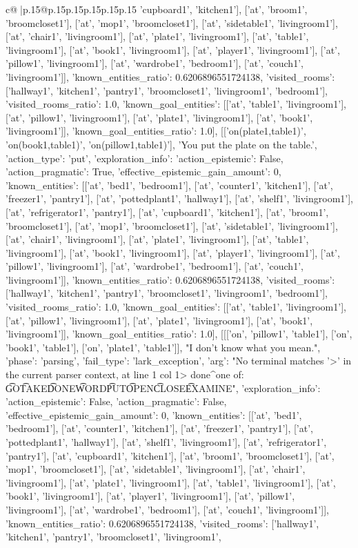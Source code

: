 \documentclass{article}
\begin{document}
{\begin{supertabular}{c@{$\;$}|p{.15\linewidth}@{}p{.15\linewidth}p{.15\linewidth}p{.15\linewidth}p{.15\linewidth}p{.15\linewidth}}
{{{'cupboard1', 'kitchen1'], ['at', 'broom1', 'broomcloset1'], ['at', 'mop1', 'broomcloset1'], ['at', 'sidetable1', 'livingroom1'], ['at', 'chair1', 'livingroom1'], ['at', 'plate1', 'livingroom1'], ['at', 'table1', 'livingroom1'], ['at', 'book1', 'livingroom1'], ['at', 'player1', 'livingroom1'], ['at', 'pillow1', 'livingroom1'], ['at', 'wardrobe1', 'bedroom1'], ['at', 'couch1', 'livingroom1']], 'known_entities_ratio': 0.6206896551724138, 'visited_rooms': ['hallway1', 'kitchen1', 'pantry1', 'broomcloset1', 'livingroom1', 'bedroom1'], 'visited_rooms_ratio': 1.0, 'known_goal_entities': [['at', 'table1', 'livingroom1'], ['at', 'pillow1', 'livingroom1'], ['at', 'plate1', 'livingroom1'], ['at', 'book1', 'livingroom1']], 'known_goal_entities_ratio': 1.0}}], [['on(plate1,table1)', 'on(book1,table1)', 'on(pillow1,table1)'], 'You put the plate on the table.', {'action_type': 'put', 'exploration_info': {'action_epistemic': False, 'action_pragmatic': True, 'effective_epistemic_gain_amount': 0, 'known_entities': [['at', 'bed1', 'bedroom1'], ['at', 'counter1', 'kitchen1'], ['at', 'freezer1', 'pantry1'], ['at', 'pottedplant1', 'hallway1'], ['at', 'shelf1', 'livingroom1'], ['at', 'refrigerator1', 'pantry1'], ['at', 'cupboard1', 'kitchen1'], ['at', 'broom1', 'broomcloset1'], ['at', 'mop1', 'broomcloset1'], ['at', 'sidetable1', 'livingroom1'], ['at', 'chair1', 'livingroom1'], ['at', 'plate1', 'livingroom1'], ['at', 'table1', 'livingroom1'], ['at', 'book1', 'livingroom1'], ['at', 'player1', 'livingroom1'], ['at', 'pillow1', 'livingroom1'], ['at', 'wardrobe1', 'bedroom1'], ['at', 'couch1', 'livingroom1']], 'known_entities_ratio': 0.6206896551724138, 'visited_rooms': ['hallway1', 'kitchen1', 'pantry1', 'broomcloset1', 'livingroom1', 'bedroom1'], 'visited_rooms_ratio': 1.0, 'known_goal_entities': [['at', 'table1', 'livingroom1'], ['at', 'pillow1', 'livingroom1'], ['at', 'plate1', 'livingroom1'], ['at', 'book1', 'livingroom1']], 'known_goal_entities_ratio': 1.0}}], [[['on', 'pillow1', 'table1'], ['on', 'book1', 'table1'], ['on', 'plate1', 'table1']], "I don't know what you mean.", {'phase': 'parsing', 'fail_type': 'lark_exception', 'arg': "No terminal matches '>' in the current parser context, at line 1 col 1\n\n> done\n^\nExpected one of: \n\t* GO\n\t* TAKE\n\t* DONE\n\t* WORD\n\t* PUT\n\t* OPEN\n\t* CLOSE\n\t* EXAMINE\n", 'exploration_info': {'action_epistemic': False, 'action_pragmatic': False, 'effective_epistemic_gain_amount': 0, 'known_entities': [['at', 'bed1', 'bedroom1'], ['at', 'counter1', 'kitchen1'], ['at', 'freezer1', 'pantry1'], ['at', 'pottedplant1', 'hallway1'], ['at', 'shelf1', 'livingroom1'], ['at', 'refrigerator1', 'pantry1'], ['at', 'cupboard1', 'kitchen1'], ['at', 'broom1', 'broomcloset1'], ['at', 'mop1', 'broomcloset1'], ['at', 'sidetable1', 'livingroom1'], ['at', 'chair1', 'livingroom1'], ['at', 'plate1', 'livingroom1'], ['at', 'table1', 'livingroom1'], ['at', 'book1', 'livingroom1'], ['at', 'player1', 'livingroom1'], ['at', 'pillow1', 'livingroom1'], ['at', 'wardrobe1', 'bedroom1'], ['at', 'couch1', 'livingroom1']], 'known_entities_ratio': 0.6206896551724138, 'visited_rooms': ['hallway1', 'kitchen1', 'pantry1', 'broomcloset1', 'livingroom1', }}}
\end{supertabular}}
\end{document}
